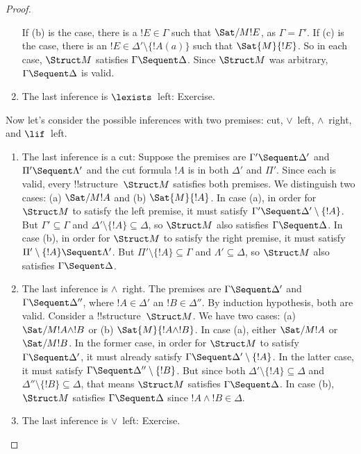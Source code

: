 \documentclass[../../include/open-logic-section]{subfiles}
\begin{document}
\begin{proof}
\begin{enumerate}
  If (b) is the case, there is a $!E \in \Gamma$ such that
  $\Sat/{M}{!E}$, as $\Gamma = \Gamma'$.  If (c) is the case, there is
  an $!E \in \Delta' \setminus \{!A(a)\}$ such that $\Sat{M}{!E}$.  So
  in each case, $\Struct M$ satisfies $\Gamma \Sequent \Delta$. Since
  $\Struct M$ was arbitrary, $\Gamma \Sequent \Delta$ is valid.
\item The last inference is $\lexists$~left: Exercise.
\end{enumerate}
Now let's consider the possible inferences with two premises: cut,
$\lor$~left, $\land$~right, and $\lif$~left.
\begin{enumerate}
\item The last inference is a cut: Suppose the premises are $\Gamma'
  \Sequent \Delta'$ and $\Pi' \Sequent \Lambda'$ and the cut formula
  $!A$ is in both $\Delta'$ and $\Pi'$.  Since each is valid, every
  !!{structure}~$\Struct M$ satisfies both premises.  We distinguish
  two cases: (a) $\Sat/{M}{!A}$ and (b) $\Sat{M}{!A}$.  In case (a), in
  order for $\Struct M$ to satisfy the left premise, it must satisfy
  $\Gamma' \Sequent \Delta' \setminus \{!A\}$.  But $\Gamma' \subseteq
  \Gamma$ and $\Delta' \setminus \{!A\} \subseteq \Delta$, so $\Struct
  M$ also satisfies $\Gamma \Sequent \Delta$.  In case (b), in order
  for $\Struct M$ to satisfy the right premise, it must satisfy $\Pi'
  \setminus \{!A\} \Sequent \Lambda'$.  But $\Pi' \setminus \{!A\}
  \subseteq \Gamma$ and $\Lambda' \subseteq \Delta$, so $\Struct M$
  also satisfies $\Gamma \Sequent \Delta$.
\item The last inference is $\land$~right. The premises are $\Gamma
  \Sequent \Delta'$ and $\Gamma \Sequent \Delta''$, where $!A \in
  \Delta'$ an $!B \in \Delta''$.  By induction hypothesis, both are
  valid.  Consider a !!{structure}~$\Struct M$.  We have two cases:
  (a) $\Sat/{M}{!A \land !B}$ or (b) $\Sat{M}{!A \land !B}$. In case
  (a), either $\Sat/{M}{!A}$ or $\Sat/{M}{!B}$.  In the former case,
  in order for $\Struct M$ to satisfy $\Gamma \Sequent \Delta'$, it
  must already satisfy $\Gamma \Sequent \Delta' \setminus \{!A\}$.  In
  the latter case, it must satisfy $\Gamma \Sequent \Delta'' \setminus
  \{!B\}$.  But since both $\Delta' \setminus \{!A\} \subseteq \Delta$
  and $\Delta'' \setminus \{!B\} \subseteq \Delta$, that means
  $\Struct M$ satisfies $\Gamma \Sequent \Delta$.  In case (b),
  $\Struct M$ satisfies $\Gamma \Sequent \Delta$ since $!A \land !B
  \in \Delta$.
\item The last inference is $\lor$~left: Exercise.

\end{enumerate}
\end{proof}
\end{document}
